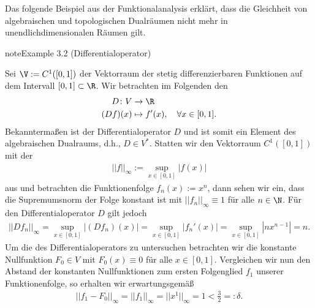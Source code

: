 \documentclass[letterpaper,10pt,german]{jupyterBook}
\begin{document}
\sphinxAtStartPar
Das folgende Beispiel aus der Funktionalanalysis erklärt, dass die Gleichheit von algebraischen und topologischen Dualräumen nicht mehr in unendlich\sphinxhyphen{}dimensionalen Räumen gilt.
\label{vektoranalysis/multilinear:example-5}
\begin{sphinxadmonition}{note}{Example 3.2 (Differentialoperator)}



\sphinxAtStartPar
Sei \(\V := C^1([0,1])\) der Vektorraum der stetig differenzierbaren Funktionen auf dem Intervall \([0,1] \subset \R\).
Wir betrachten im Folgenden den 
\begin{equation*}
\begin{split}D \colon V &\rightarrow \R \\
(Df)(x) &\mapsto f'(x), \quad \forall x \in [0,1].\end{split}
\end{equation*}
\sphinxAtStartPar
Bekanntermaßen ist der Differentialoperator \(D\)  und ist somit ein Element des algebraischen Dualraums, d.h., \(D \in V^\ast\).
Statten wir den Vektorraum \(C^1([0,1])\) mit der 
\begin{equation*}
\begin{split}||f||_\infty := \sup_{x \in [0,1]} |f(x)|\end{split}
\end{equation*}
\sphinxAtStartPar
aus und betrachten die Funktionenfolge \(f_n(x) := x^n\), dann sehen wir ein, dass die Supremumsnorm der Folge konstant ist mit \(||f_n||_\infty \equiv 1\) für alle \(n\in\N\).
Für den Differentialoperator \(D\) gilt jedoch
\begin{equation*}
\begin{split}||Df_n||_\infty = \sup_{x \in [0,1]} |(Df_n)(x)| = \sup_{x \in [0,1]} |f_n'(x)| = \sup_{x \in [0,1]} |nx^{n-1}| = n.\end{split}
\end{equation*}
\sphinxAtStartPar
Um die  des Differentialoperators zu untersuchen betrachten wir die konstante Nullfunktion \(F_0 \in V\) mit \(F_0(x) \equiv 0\) für alle \(x \in [0,1]\).
Vergleichen wir nun den Abstand der konstanten Nullfunktionen zum ersten Folgenglied \(f_1\) unserer Funktionenfolge, so erhalten wir erwartungsgemäß
\begin{equation*}
\begin{split}||f_1 - F_0||_\infty = ||f_1||_\infty = ||x^1||_\infty = 1 < \frac{3}{2} =: \delta.\end{split}

\end{equation*}
\end{sphinxadmonition}
\end{document}
